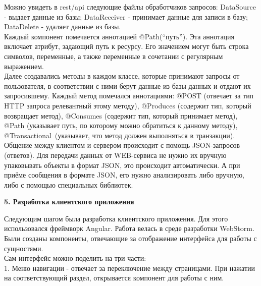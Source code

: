 \documentclass[a4paper]{article}
\begin{document}
\normalsize {Можно увидеть в rest/api следующие файлы обработчиков запросов:  DataSource - выдает данные из базы; DataReceiver - принимает данные для записи в базу; DataDelete - удаляет данные из базы.
}\\


\normalsize {Каждый компонент помечается аннотацией @Path(“путь”). Эта аннотация включает атрибут, задающий путь к ресурсу. Его значением могут быть строка символов, переменные, а также переменные в сочетании с регулярным выражением. }\\


\normalsize {Далее создавались методы в каждом классе, которые принимают запросы от пользователя, в соответствии с ними берут данные из базы данных и отдают их запросившему. Каждый метод помечался аннотациями: @POST (отвечает за тип HTTP запроса релевантный этому методу),
@Produces (содержит тип, который возвращает метод), 
@Consumes (содержит тип, который принимает метод), 
@Path (указывает путь, по которому можно обратиться к данному методу),
@Transactional (указывает, что метод должен выполняться в транзакции).
 }\\


\normalsize {Общение между клиентом и сервером происходит с помощь JSON-запросов (ответов). Для передачи данных от WEB-сервиса не нужно их вручную упаковывать объекты в формат JSON, это происходит автоматически. А при приёме сообщения в формате JSON, его нужно анализировать либо вручную, либо с помощью специальных библиотек.}\\

\newpage

\hfill \break
\hfill \break
\begin{center}
\Large{\textbf{5. Разработка клиентского приложения
}}\\
\end{center}


\normalsize{Следующим шагом была разработка клиентского приложения. Для этого использовался фреймворк Angular. Работа велась в среде разработки WebStorm.
}\\


\normalsize{Были созданы компоненты, отвечающие за отображение интерфейса для работы с сущностями.
}\\


\normalsize{Сам интерфейс можно поделить на три части:
}\\


\normalsize{1.	Меню навигации - отвечает за переключение между страницами. При нажатии на соответствующий раздел, открывается компонент для работы с ним.
}\\
\end{document}
